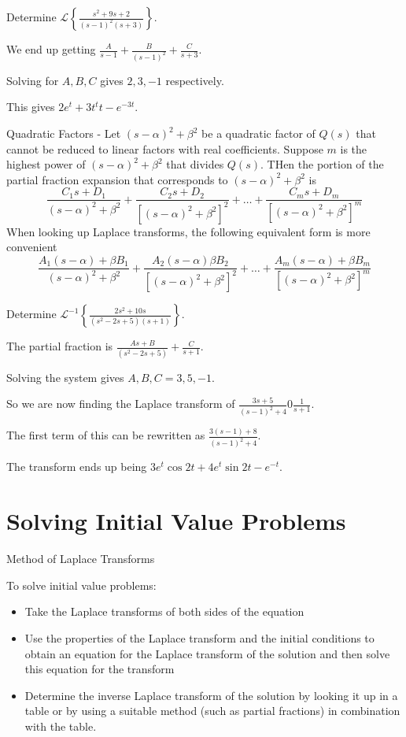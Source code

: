 \documentclass[../diffeq.tex]{subfiles}
\begin{document}
\begin{example}
    Determine $\mathcal{L}\left\{\frac{s^2+9s+2}{(s-1)^2(s+3)}\right\}$.

    We end up getting $\frac{A}{s-1}+\frac{B}{(s-1)^2}+\frac{C}{s+3}$.

    Solving for $A,B,C$ gives $2,3,-1$ respectively.

    This gives $2e^t+3t^t t - e^{-3t}$.
\end{example}

Quadratic Factors - Let $(s-\alpha)^2+\beta^2$ be a quadratic factor of $Q(s)$ that cannot be reduced to linear factors with real coefficients. Suppose $m$ is the highest power of 
$(s-\alpha)^2+\beta^2$ that divides $Q(s)$. THen the portion of the partial fraction expansion that corresponds to $(s-\alpha)^2+\beta^2$ is 
\[ \frac{C_1 s+D_1}{(s-\alpha)^2+\beta^2}+\frac{C_2s+D_2}{[(s-\alpha)^2+\beta^2]^2}+\dots + \frac{C_ms+D_m}{[(s-\alpha)^2+\beta^2]^m} \]
When looking up Laplace transforms, the following equivalent form is more convenient 
\[ \frac{A_1(s-\alpha)+\beta B_1}{(s-\alpha)^2+\beta^2}+\frac{A_2(s-\alpha)\beta B_2}{[(s-\alpha)^2+\beta^2]^2}+\dots + \frac{A_m(s-\alpha)+\beta B_m}{[(s-\alpha)^2+\beta^2]^m} \]

\begin{example}
    Determine $\mathcal{L}^{-1}\left\{\frac{2s^2+10s}{(s^2-2s+5)(s+1)}\right\}$.

    The partial fraction is $\frac{As+B}{(s^2-2s+5)}+\frac{C}{s+1}$.

    Solving the system gives $A,B,C=3,5,-1$.

    So we are now finding the Laplace transform of $\frac{3s+5}{(s-1)^2+4}0\frac{1}{s+1}$.

    The first term of this can be rewritten as $\frac{3(s-1)+8}{(s-1)^2+4}$.

    The transform ends up being $3e^t\cos 2t + 4e^t \sin 2t - e^{-t}$.
\end{example}

\section{Solving Initial Value Problems}
Method of Laplace Transforms 

To solve initial value problems:
\begin{itemize}
    \item Take the Laplace transforms of both sides of the equation 
    \item Use the properties of the Laplace transform and the initial conditions to obtain an equation for the Laplace transform of the solution and then solve this equation for the transform 
    \item Determine the inverse Laplace transform of the solution by looking it up in a table or by using a suitable method (such as partial fractions) in combination with the table.
\end{itemize}
\end{document}
